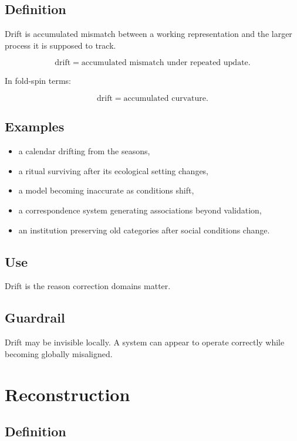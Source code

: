 \documentclass[11pt]{book}
\begin{document}
\subsection*{Definition}

Drift is accumulated mismatch between a working representation and the larger process it is supposed to track.

\[
\text{drift} = \text{accumulated mismatch under repeated update}.
\]

In fold-spin terms:

\[
\text{drift} = \text{accumulated curvature}.
\]

\subsection*{Examples}

\begin{itemize}
    \item a calendar drifting from the seasons,
    \item a ritual surviving after its ecological setting changes,
    \item a model becoming inaccurate as conditions shift,
    \item a correspondence system generating associations beyond validation,
    \item an institution preserving old categories after social conditions change.
\end{itemize}

\subsection*{Use}

Drift is the reason correction domains matter.

\subsection*{Guardrail}

Drift may be invisible locally. A system can appear to operate correctly while becoming globally misaligned.

\section{Reconstruction}

\subsection*{Definition}
\end{document}
